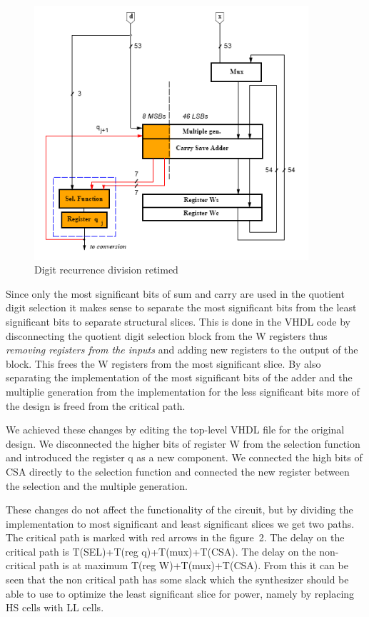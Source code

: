 \documentclass[11pt,a4paper]{article}
\begin{document}
\begin{figure}[h]
	\centering
		\includegraphics[width=4in]{./retiming.PNG}
	\caption{Digit recurrence division retimed}
	\label{fig:retiming}
\end{figure}

Since only the most significant bits of sum and carry are used in the quotient digit selection it makes sense to separate the most significant bits from the least significant bits to separate structural slices. This is done in the VHDL code by disconnecting the quotient digit selection block from the W registers thus \textit{removing registers from the inputs} and adding new registers to the output of the block. This frees the W registers from the most significant slice. By also separating the implementation of the most significant bits of the adder and the multiplie generation from the implementation for the less significant bits more of the design is freed from the critical path.

We achieved these changes by editing the top-level VHDL file for the original design. We disconnected the higher bits of register W from the selection function and introduced the register q as a new component. We connected the high bits of CSA directly to the selection function and connected the new register between the selection and the multiple generation.

These changes do not affect the functionality of the circuit, but by dividing the implementation to most significant and least significant slices we get two paths. The critical path is marked with red arrows in the figure~2. The delay on the critical path is T(SEL)+T(reg q)+T(mux)+T(CSA). The delay on the non-critical path is at maximum T(reg W)+T(mux)+T(CSA). From this it can be seen that the non critical path has some slack which the synthesizer should be able to use to optimize the least significant slice for power, namely by replacing HS cells with LL cells.
\end{document}
